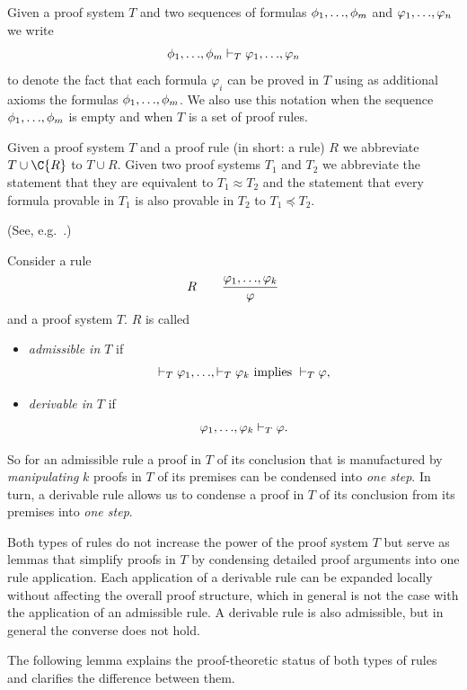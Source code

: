 \documentclass[manuscript, screen, review]{acmart}
\begin{document}
Given a proof system $T$ and two sequences of formulas
$\phi_1, \mbox{$\ldots$}, \phi_m$ and $\varphi_1, \mbox{$\ldots$}, \varphi_n$ we write
\[
  \phi_1, \mbox{$\ldots$}, \phi_m \vdash_T \varphi_1, \mbox{$\ldots$}, \varphi_n
\]
to denote the fact that each formula $\varphi_i$ can be proved in
$T$ using as additional axioms the formulas
$\phi_1, \mbox{$\ldots$}, \phi_m$.  We also use this notation when the sequence
$\phi_1, \mbox{$\ldots$}, \phi_m$ is empty and when $T$ is a set of proof
rules.

Given a proof system $T$ and a proof rule (in short: a rule) $R$ we
abbreviate $T \cup \C{R}$ to $T \cup R$. Given two proof systems $T_1$
and $T_2$ we abbreviate the statement that they are equivalent to
$T_1 \approx T_2$ and the statement that every formula provable in
$T_1$ is also provable in $T_2$ to $T_1 \preceq T_2$.

\begin{definition}(See, e.g.~\cite[page 47]{Pla13}.)
  
  Consider a rule
  \[ 
  R \qquad \frac{\varphi_1,\mbox{$\ldots$},\varphi_k}{\varphi}
\]
and a proof system $T$. $R$ is called
\begin{itemize}
\item \emph{admissible in $T$} if 
\[
 \vdash_T \varphi_1, \mbox{$\ldots$}, \vdash_T \varphi_k
 \mbox{ implies }
 \vdash_T \varphi,
\]

\item \emph{derivable in $T$} if 
\[
 \varphi_1, \mbox{$\ldots$}, \varphi_k \vdash_T \varphi.
\]

\end{itemize}

\end{definition}

So for an admissible rule a proof in $T$ of its conclusion 
that is manufactured by \emph{manipulating} $k$ proofs in $T$ 
of its premises can be condensed into \emph{one step}. 
In turn, a derivable rule allows us to condense a proof in $T$ of
its conclusion from its premises into \emph{one step}.

Both types of rules do not increase the power of the proof system $T$
but serve as lemmas that simplify proofs in $T$ by condensing detailed
proof arguments into one rule application.  Each application of a
derivable rule can be expanded locally without affecting the overall
proof structure, which in general is not the case with the application
of an admissible rule.  A derivable rule is also admissible, but in
general the converse does not hold.

The following lemma explains the proof-theoretic status of both types
of rules and clarifies the difference between them.
\end{document}
